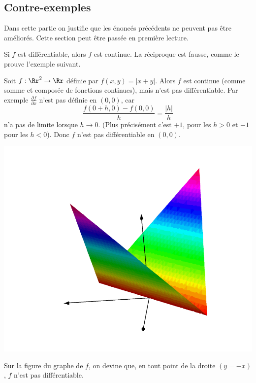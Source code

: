 \documentclass[12pt, class=report,crop=false]{standalone}
\begin{document}
{ 

\subsection{Contre-exemples}


Dans cette partie on justifie que les énoncés précédents ne peuvent pas être améliorés. Cette section peut être passée en première lecture.


\bigskip


Si $f$ est différentiable, alors $f$ est continue. La réciproque est fausse, comme le prouve l'exemple suivant.

\begin{exemple}
Soit $f : \Rr^2 \to \Rr$ définie par $f(x,y) = |x+y|$.
Alors $f$ est continue (comme somme et composée de fonctions continues), mais n'est pas différentiable. Par exemple $\frac{\partial f}{\partial x}$ n'est pas définie en $(0,0)$, car 
$$\frac{f(0+h,0)-f(0,0)}{h} = \frac{|h|}{h}$$
n'a pas de limite lorsque $h \to 0$. (Plus précisément c'est $+1$, pour les $h>0$ et $-1$ pour les $h<0$). Donc $f$ n'est pas différentiable en $(0,0)$.


\begin{center}
  \includegraphics[scale=0.3]{figures/fig-calculdiff-03}
\end{center}


Sur la figure du graphe de $f$, on devine que, en tout point de la droite $(y=-x)$, $f$ n'est pas différentiable.
\end{exemple}


}
\end{document}
